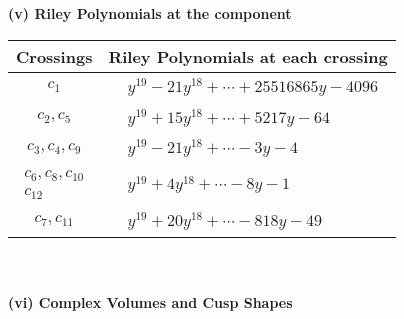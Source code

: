 \documentclass[1p]{elsarticle_modified}
\theoremstyle{definition}
\begin{document}
\newpage\renewcommand{\arraystretch}{1}
\flushleft \textbf{(v) Riley Polynomials at the component}\newline \\
\begin{tabular}{m{50pt}|m{274pt}}
Crossings & \hspace{64pt}Riley Polynomials at each crossing \\
\hline $$\begin{aligned}c_{1}\end{aligned}$$&$\begin{aligned}
&y^{19}-21 y^{18}+\cdots+25516865 y-4096
\end{aligned}$\\
\hline $$\begin{aligned}c_{2},c_{5}\end{aligned}$$&$\begin{aligned}
&y^{19}+15 y^{18}+\cdots+5217 y-64
\end{aligned}$\\
\hline $$\begin{aligned}c_{3},c_{4},c_{9}\end{aligned}$$&$\begin{aligned}
&y^{19}-21 y^{18}+\cdots-3 y-4
\end{aligned}$\\
\hline $$\begin{aligned}c_{6},c_{8},c_{10}\\c_{12}\end{aligned}$$&$\begin{aligned}
&y^{19}+4 y^{18}+\cdots-8 y-1
\end{aligned}$\\
\hline $$\begin{aligned}c_{7},c_{11}\end{aligned}$$&$\begin{aligned}
&y^{19}+20 y^{18}+\cdots-818 y-49
\end{aligned}$\\
\hline
\end{tabular}\\~\\
\newpage\flushleft \textbf{(vi) Complex Volumes and Cusp Shapes}
\end{document}
